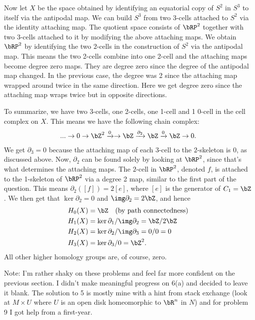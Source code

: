 \begin{homework}[e]
\begin{prf}
    Now let $X$ be the space obtained by identifying an equatorial copy of $S^2$ in $S^3$ to itself via the antipodal map. We can build $S^3$ from two 3-cells attached to $S^2$ via the identity attaching map. The quotient space consists of $\bRP^2$ together with two $3$-cells attached to it by modifying the above attaching maps. We obtain $\bRP^2$ by identifying the two $2$-cells in the construction of $S^2$ via the antipodal map. This means the two 2-cells combine into one 2-cell and the attaching maps become degree zero maps. They are degree zero since the degree of the antipodal map changed. In the previous case, the degree was 2 since the attaching map wrapped around twice in the same direction. Here we get degree zero since the attaching map wraps twice but in opposite directions.

    To summarize, we have two 3-cells, one 2-cells, one 1-cell and 1 0-cell in the cell complex on $X$. This means we have the following chain complex:
    \begin{align*}
      ... \to 0 \to \bZ^2 \xrightarrow{0} \to \bZ \xrightarrow{\partial_2} \bZ \xrightarrow{0} \bZ \to 0.
    \end{align*}
    We get $\partial_3 = 0$ because the attaching map of each $3$-cell to the $2$-skeleton is 0, as discussed above. Now, $\partial_2$ can be found solely by looking at $\bRP^2$, since that's what determines the attaching maps. The $2$-cell in $\bRP^2$, denoted $f$, is attached to the 1-skeleton of $\bRP^2$ via a degree 2 map, similar to the first part of the question. This means $\partial_2([f]) = 2[e]$, where $[e]$ is the generator of $C_1 = \bZ$. We then get that $\ker\partial_2 = 0$ and $\img\partial_2 = 2\bZ$, and hence
    \begin{align*}
      H_0(X) &= \bZ \hspace{1em}\text{(by path connectedness)} \\
      H_1(X) &= \ker\partial_1/\img\partial_2 = \bZ/2\bZ \\
      H_2(X) &= \ker\partial_2/\img\partial_3 = 0/0 = 0 \\
      H_3(X) &= \ker\partial_3/0 = \bZ^2.
    \end{align*}
    All other higher homology groups are, of course, zero.
  \end{prf}
\end{homework}
\newpage
{}
Note: I'm rather shaky on these problems and feel far more confident on the previous section. I didn't make meaningful progress on 6(a) and decided to leave it blank. The solution to 5 is mostly mine with a hint from stack exchange (look at $M\times U$ where $U$ is an open disk homeomorphic to $\bR^n$ in $N$) and for problem 9 I got help from a first-year.


